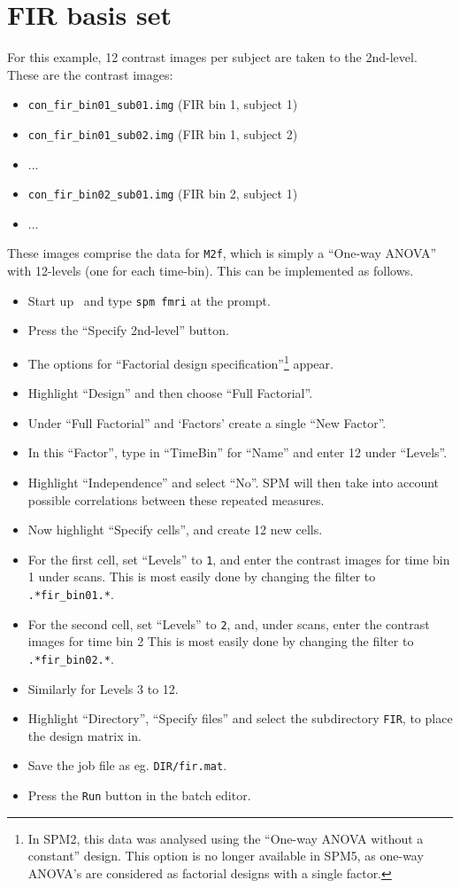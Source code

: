 \section{FIR basis set}

For this example, 12 contrast images per subject are taken to the 2nd-level. These are the contrast images:

\begin{itemize}
\item \texttt{con\_fir\_bin01\_sub01.img}    (FIR bin 1, subject 1)
\item \texttt{con\_fir\_bin01\_sub02.img}    (FIR bin 1, subject 2)
\item ...
\item \texttt{con\_fir\_bin02\_sub01.img}    (FIR bin 2, subject 1)
\item ...
\end{itemize}

These images comprise the data for \texttt{M2f}, which is simply a ``One-way ANOVA'' with 12-levels (one for each time-bin). This can be implemented as follows.
\begin{itemize}
\item Start up \matlab\ and type \texttt{spm fmri} at the prompt.
\item Press the ``Specify 2nd-level'' button.
\item The options for ``Factorial design specification''\footnote{In SPM2, this data was analysed using the ``One-way ANOVA without a constant'' design. This option is no longer available in SPM5, as one-way ANOVA's are considered as factorial designs with a single factor.} appear.
\item Highlight ``Design'' and then choose ``Full Factorial''.
\item Under ``Full Factorial'' and `Factors' create a single ``New Factor''.
\item In this ``Factor'', type in ``TimeBin'' for ``Name'' and enter 12 under ``Levels''.
\item Highlight ``Independence'' and select ``No''. SPM will then take into account possible correlations between these repeated measures.
\item Now highlight ``Specify cells'', and create 12 new cells.
\item For the first cell, set ``Levels'' to \texttt{1}, and enter the contrast images for time bin 1 under scans. This is most easily done by changing the filter to \texttt{.*fir\_bin01.*}.
\item For the second cell, set ``Levels'' to \texttt{2}, and, under scans, enter the contrast images for time bin 2 This is most easily done by changing the filter to \texttt{.*fir\_bin02.*}.
\item Similarly for Levels 3 to 12.
\item Highlight ``Directory'', ``Specify files'' and select the subdirectory \texttt{FIR}, to place the design matrix in.
\item Save the job file as eg. \texttt{DIR/fir.mat}.
\item Press the \texttt{Run} button in the batch editor.
\end{itemize}


